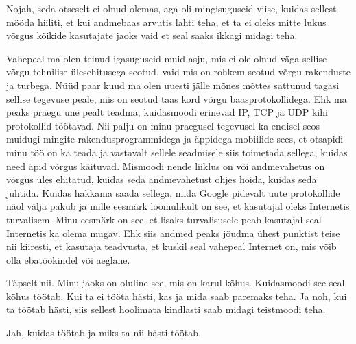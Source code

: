 
Nojah, seda otseselt ei olnud olemas, aga oli mingisuguseid viise, kuidas 
sellest mööda hiiliti, et  kui andmebaas arvutis lahti teha, et ta ei oleks 
mitte lukus võrgus kõikide kasutajate jaoks vaid et seal saaks ikkagi midagi 
teha. 


Vahepeal ma olen teinud igasuguseid muid asju, mis ei ole olnud väga sellise 
võrgu tehnilise ülesehitusega seotud, vaid mis on rohkem seotud võrgu 
rakenduste ja turbega. Nüüd paar kuud ma olen uuesti jälle mõnes mõttes 
sattunud tagasi sellise tegevuse peale, mis on seotud taas kord võrgu 
baasprotokollidega. Ehk  ma peaks praegu une pealt teadma, kuidasmoodi erinevad 
IP,  TCP  ja UDP kihi protokollid töötavad. Nii palju on minu praegusel 
tegevusel ka endisel seos muidugi mingite rakendusprogrammidega ja äppidega  
mobiilide sees, et otsapidi minu töö on ka teada ja vastavalt sellele 
seadmisele siis toimetada sellega, kuidas need äpid võrgus käituvad. Mismoodi 
nende liiklus on või  andmevahetus on võrgus üles ehitatud, kuidas seda 
andmevahetust ohjes hoida, kuidas seda juhtida. Kuidas hakkama saada sellega, 
mida Google pidevalt uute protokollide näol välja pakub ja mille eesmärk 
loomulikult on see, et kasutajal oleks Internetis turvalisem. Minu eesmärk on 
see, et lisaks turvalisusele peab kasutajal seal Internetis ka olema mugav. Ehk 
siis andmed peaks jõudma ühest punktist teise nii kiiresti, et kasutaja 
teadvusta, et  kuskil seal vahepeal Internet on, mis võib olla ebatöökindel või 
aeglane.


Täpselt nii. Minu jaoks on oluline see, mis on karul kõhus. Kuidasmoodi see 
seal kõhus töötab. Kui ta ei tööta hästi, kas ja mida  saab paremaks teha. Ja 
noh, kui ta töötab hästi, siis  sellest hoolimata kindlasti saab midagi 
teistmoodi teha.


Jah, kuidas töötab ja miks  ta nii hästi töötab.
